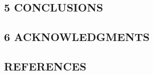 \documentclass[
]{article}
\begin{document}
\hypertarget{conclusions}{%
\subsection{5 \textbar{} CONCLUSIONS}\label{conclusions}}

\hypertarget{acknowledgments}{%
\subsection{6 \textbar{} ACKNOWLEDGMENTS}\label{acknowledgments}}

\hypertarget{references}{%
\subsection*{REFERENCES}\label{references}}
\end{document}
